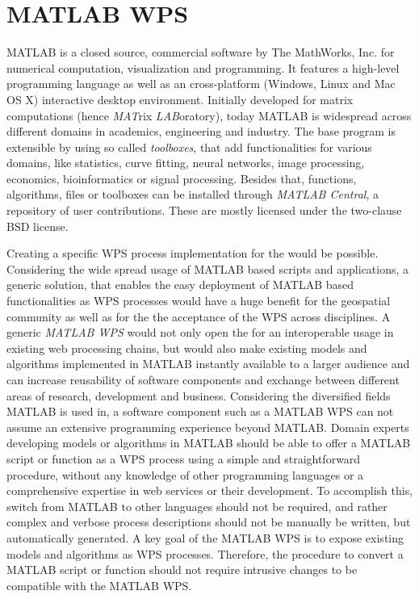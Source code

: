 \chapter{MATLAB WPS}
	MATLAB is a closed source, commercial software by The MathWorks, Inc. for numerical computation, visualization and programming. It features a high-level programming language as well as an cross-platform (Windows, Linux and Mac OS X) interactive desktop environment. Initially developed for matrix computations (hence \emph{MAT}rix \emph{LAB}oratory), today MATLAB is widespread across different domains in academics, engineering and industry. The base program is extensible by using so called \emph{toolboxes}, that add functionalities for various domains, like statistics, curve fitting, neural networks, image processing, economics, bioinformatics or signal processing. Besides that, functions, algorithms, files or toolboxes can be installed through \emph{MATLAB Central}, a repository of user contributions. These are mostly licensed under the two-clause BSD license.

	Creating a specific \ac{WPS} process implementation for the \la would be possible. Considering the wide spread usage of MATLAB based scripts and applications, a generic solution, that enables the easy deployment of MATLAB based functionalities as \ac{WPS} processes would have a huge benefit for the geospatial community as well as for the the acceptance of the \ac{WPS} across disciplines. A generic \emph{MATLAB WPS} would not only open the \la for an interoperable usage in existing web processing chains, but would also make existing models and algorithms implemented in MATLAB instantly available to a larger audience and can increase reusability of software components and exchange between different areas of research, development and business. Considering the diversified fields MATLAB is used in, a software component such as a MATLAB WPS can not assume an extensive programming experience beyond MATLAB. Domain experts developing models or algorithms in MATLAB should be able to offer a MATLAB script or function as a \ac{WPS} process using a simple and straightforward procedure, without any knowledge of other programming languages or a comprehensive expertise in web services or their development. To accomplish this, switch from MATLAB to other languages should not be required, and rather complex and verbose process descriptions should not be manually be written, but automatically generated. A key goal of the MATLAB WPS is to expose existing models and algorithms as \ac{WPS} processes. Therefore, the procedure to convert a MATLAB script or function should not require intrusive changes to be compatible with the MATLAB WPS.


